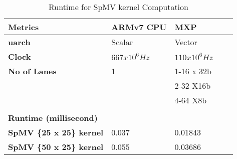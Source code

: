 \begin{table}[htbp]
	\centering
	
	\begin{adjustbox}{width=.7\textwidth}
		\small
		
	\begin{tabular}{lllll}
		\toprule
		\textbf{Metrics} & \textbf{ARMv7 CPU} & \textbf{MXP}  \\
		\midrule
		\textbf{uarch} & Scalar & Vector \\
		\textbf{Clock} & $667 x 10^{6} Hz$ & $110 x 10^{6}Hz$  \\
		\textbf{No of Lanes} & 1 & 1-16 x 32b  \\
		&   & 2-32 X16b  \\
		&   & 4-64 X8b \\
		&   &   \\
		\midrule
		\textbf{Runtime (millisecond)  } &   &   &   &  \\
		\midrule
		\textbf{SpMV \{25 x 25\} kernel} & 0.037 & 0.01843  \\
		\textbf{SpMV \{50 x 25\} kernel} & 0.055 & 0.03686  \\
		\bottomrule
	\end{tabular}%
    \end{adjustbox}%
      \caption{Runtime for SpMV kernel Computation}
	\label{www:1010}%
\end{table}%
    	 